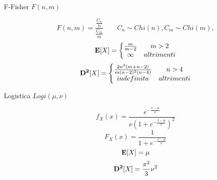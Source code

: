 \begin{description}
	\item[F-Fisher $F(n,m)$]
		\begin{equation}
		F(n,m) = \frac{\frac{C_{n}}{n}}{\frac{C_{m}}{m}}
		\qquad
		C_{n}\sim Chi(n),
		C_{m}\sim Chi(m),
		\end{equation}
		\begin{equation}
		\mathbf{E}[X] = \left\{\begin{matrix}
		\frac{m}{m-2} & m>2 \\
		\infty & altrimenti
		\end{matrix}\right.
		\end{equation}
		\begin{equation}
		\mathbf{D^{2}}[X] = \left\{\begin{matrix}
		\frac{2n^{2}(m+n-2)}{m(n-2)^{2}(n-4)} & n>4 \\
		indefinita & altrimenti
		\end{matrix}\right.
		\end{equation}
		
	\item[Logistica $Logi(\mu,\nu)$]
		\begin{equation}
		f_{X}(x)=\frac{e^{-\frac{x-\mu}{\nu}}}{\nu(1+e^{-\frac{x-\mu}{\nu}})^{2}}
		\end{equation}
		\begin{equation}
		F_{X}(x)=\frac{1}{1+e^{-\frac{x-\mu}{\nu}}}
		\end{equation}
		\begin{equation}
		\mathbf{E}[X]=\mu
		\end{equation}
		\begin{equation}
		\mathbf{D^{2}}[X]=\frac{\pi^{{2}}}{3}\nu^{2}
		\end{equation}
	
\end{description}
\newpage

